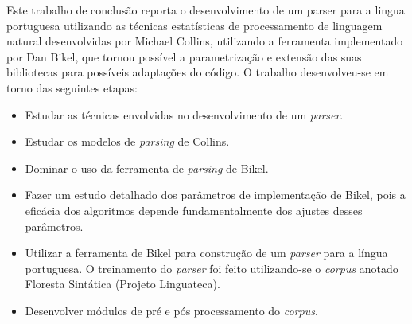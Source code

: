 Este trabalho de conclusão reporta o desenvolvimento de um parser para a lingua portuguesa utilizando as técnicas estatísticas de processamento de linguagem natural desenvolvidas por Michael Collins, utilizando a ferramenta implementado por Dan Bikel, que tornou possível a parametrização e extensão das suas bibliotecas para possíveis adaptações do código. O trabalho desenvolveu-se em torno das seguintes etapas:

\begin{itemize}
	\item Estudar as técnicas envolvidas no desenvolvimento de um \emph{parser}.
	\item Estudar os modelos de \emph{parsing} de Collins.
	\item Dominar o uso da ferramenta de \emph{parsing} de Bikel.
	\item Fazer um estudo detalhado dos parâmetros de implementação de Bikel, pois a eficácia dos algoritmos depende fundamentalmente dos ajustes desses parâmetros.
	\item Utilizar a ferramenta de Bikel para construção de um \emph{parser} para a língua portuguesa. O treinamento do \emph{parser} foi feito utilizando-se o \emph{corpus} anotado Floresta Sintática (Projeto Linguateca).
	\item Desenvolver módulos de pré e pós processamento do \emph{corpus}.
\end{itemize}

